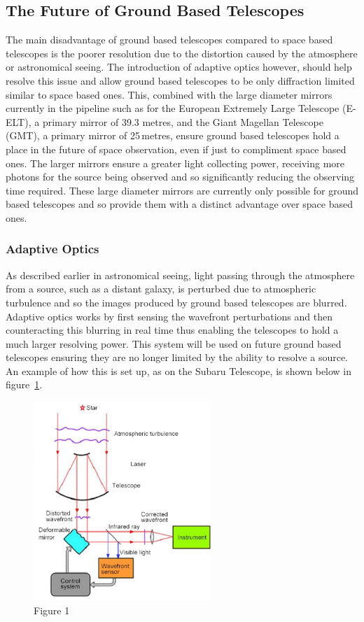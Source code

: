 	\subsection{The Future of Ground Based Telescopes} %
	\label{sub:the_future_of_ground_based_telescopes}
		The main disadvantage of ground based telescopes compared to space based telescopes is the poorer resolution due to the distortion caused by the atmosphere or astronomical seeing. The introduction of adaptive optics however, should help resolve this issue and allow ground based telescopes to be only diffraction limited similar to space based ones. This, combined with the large diameter mirrors currently in the pipeline such as for the European Extremely Large Telescope (E-ELT), a primary mirror of 39.3 metres, and the Giant Magellan Telescope (GMT), a primary mirror of 25\,metres, ensure ground based telescopes hold a place in the future of space observation, even if just to compliment space based ones. The larger mirrors ensure a greater light collecting power, receiving more photons for the source being observed and so significantly reducing the observing time required. These large diameter mirrors are currently only possible for ground based telescopes and so provide them with a distinct advantage over space based ones.

		\subsubsection{Adaptive Optics} %
		\label{ssub:adaptive_optics}
			As described earlier in astronomical seeing, light passing through the atmosphere from a source, such as a distant galaxy, is perturbed due to atmospheric turbulence and so the images produced by ground based telescopes are blurred. Adaptive optics works by first sensing the wavefront perturbations and then counteracting this blurring in real time thus enabling the telescopes to hold a much larger resolving power. This system will be used on future ground based telescopes ensuring they are no longer limited by the ability to resolve a source. An example of how this is set up, as on the Subaru Telescope, is shown below in figure~\ref{fig:AdaptiveOptics}.
			\begin{figure}[ht]
				\centering
				\includegraphics[width=0.6\textwidth]{../Images/AdaptiveOptics.png}
				\caption{Figure 1}\label{fig:AdaptiveOptics}
			\end{figure}

